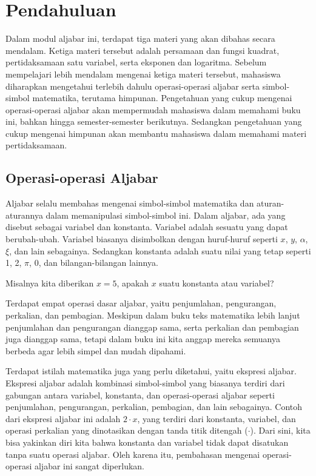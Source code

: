 \chapter{Pendahuluan}
\label{sec:intro}

Dalam modul aljabar ini, terdapat tiga materi yang akan dibahas secara mendalam. Ketiga materi tersebut adalah persamaan dan fungsi kuadrat, pertidaksamaan satu variabel, serta eksponen dan logaritma. Sebelum mempelajari lebih mendalam mengenai ketiga materi tersebut, mahasiswa diharapkan mengetahui terlebih dahulu operasi-operasi aljabar serta simbol-simbol matematika, terutama himpunan. Pengetahuan yang cukup mengenai operasi-operasi aljabar akan mempermudah mahasiswa dalam memahami buku ini, bahkan hingga semester-semester berikutnya. Sedangkan pengetahuan yang cukup mengenai himpunan akan membantu mahasiswa dalam memahami materi pertidaksamaan.

\section{Operasi-operasi Aljabar}

Aljabar selalu membahas mengenai simbol-simbol matematika dan aturan-aturannya dalam memanipulasi simbol-simbol ini. Dalam aljabar, ada yang disebut sebagai variabel dan konstanta. Variabel adalah sesuatu yang dapat berubah-ubah. Variabel biasanya disimbolkan dengan huruf-huruf seperti $ x $, $ y $, $ \alpha $, $ \xi $, dan lain sebagainya. Sedangkan konstanta adalah suatu nilai yang tetap seperti 1, 2, $ \pi $, 0, dan bilangan-bilangan lainnya.

\begin{explbox}
	Misalnya kita diberikan $ x = 5 $, apakah $ x $ suatu konstanta atau variabel?
\end{explbox}

\par Terdapat empat operasi dasar aljabar, yaitu penjumlahan, pengurangan, perkalian, dan pembagian. Meskipun dalam buku teks matematika lebih lanjut penjumlahan dan pengurangan dianggap sama, serta perkalian dan pembagian juga dianggap sama, tetapi dalam buku ini kita anggap mereka semuanya berbeda agar lebih simpel dan mudah dipahami.

\par Terdapat istilah matematika juga yang perlu diketahui, yaitu ekspresi aljabar. Ekspresi aljabar adalah kombinasi simbol-simbol yang biasanya terdiri dari gabungan antara variabel, konstanta, dan operasi-operasi aljabar seperti penjumlahan, pengurangan, perkalian, pembagian, dan lain sebagainya. Contoh dari ekspresi aljabar ini adalah $ 2 \cdot x $, yang terdiri dari konstanta, variabel, dan operasi perkalian yang dinotasikan dengan tanda titik ditengah ($ \cdot $). Dari sini, kita bisa yakinkan diri kita bahwa konstanta dan variabel tidak dapat disatukan tanpa suatu operasi aljabar. Oleh karena itu, pembahasan mengenai operasi-operasi aljabar ini sangat diperlukan.

